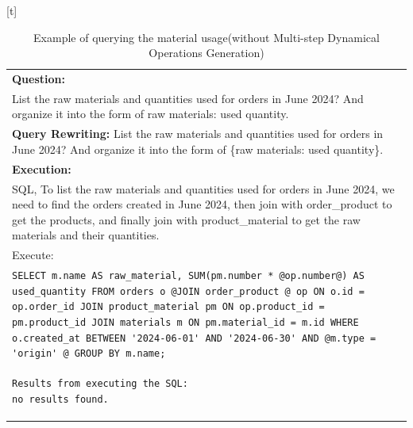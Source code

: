 \documentclass[preprint,12pt]{elsarticle}
\begin{document}
\begin{center}[t]
\begin{longtable}{p{390pt}}
\caption{Example of querying the material usage(without Multi-step Dynamical Operations Generation)}
    \label{tab:case_query_material_without_muti_step}\\
    \toprule
      \textbf{Question:}     \\
       List the raw materials and quantities used for orders in June 2024? And organize it into the form of {raw materials: used quantity}.\\
          \hline
          \textbf{Query Rewriting: }
          List the raw materials and quantities used for orders in June 2024? And organize it into the form of \{raw materials: used quantity\}.\\
 \hline

\hline
\textbf{Execution:}\\
SQL, To list the raw materials and quantities used for orders in June 2024, we need to find the orders created in June 2024, then join with order\_product to get the products, and finally join with product\_material to get the raw materials and their quantities.\\
Execute:\\
\lstinline!SELECT m.name AS raw_material, SUM(pm.number * @op.number@) AS used_quantity FROM orders o @JOIN order_product @ op ON o.id = op.order_id JOIN product_material pm ON op.product_id = pm.product_id JOIN materials m ON pm.material_id = m.id WHERE o.created_at BETWEEN '2024-06-01' AND '2024-06-30' AND @m.type = 'origin' @ GROUP BY m.name;! \\
\begin{lstlisting}[style=sql_command]
Results from executing the SQL:
no results found.
\end{lstlisting}\\ \hline
\end{longtable}
\end{center}
\end{document}
